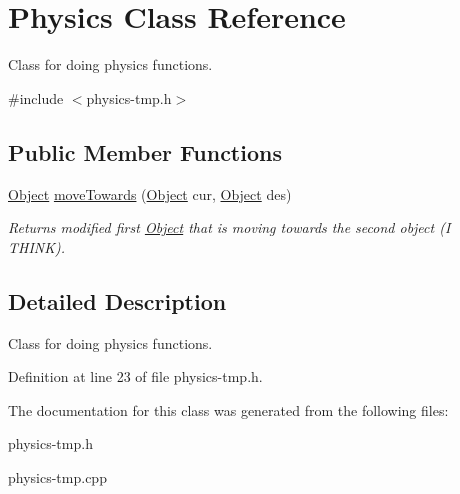 \hypertarget{classPhysics}{}\section{Physics Class Reference}
\label{classPhysics}


Class for doing physics functions.  




{\ttfamily \#include $<$physics-\/tmp.\+h$>$}

\subsection*{Public Member Functions}
\begin{DoxyCompactItemize}
\item 
\mbox{\label{classPhysics_a8e53f9bf088c0d4f208b3c2029d69ab2}} 
\hyperlink{classObject}{Object} \hyperlink{classPhysics_a8e53f9bf088c0d4f208b3c2029d69ab2}{move\+Towards} (\hyperlink{classObject}{Object} cur, \hyperlink{classObject}{Object} des)
\begin{DoxyCompactList}\small\item\em Returns modified first \hyperlink{classObject}{Object} that is moving towards the second object (I T\+H\+I\+NK). \end{DoxyCompactList}\end{DoxyCompactItemize}


\subsection{Detailed Description}
Class for doing physics functions. 

Definition at line 23 of file physics-\/tmp.\+h.



The documentation for this class was generated from the following files\+:\begin{DoxyCompactItemize}
\item 
physics-\/tmp.\+h\item 
physics-\/tmp.\+cpp\end{DoxyCompactItemize}
